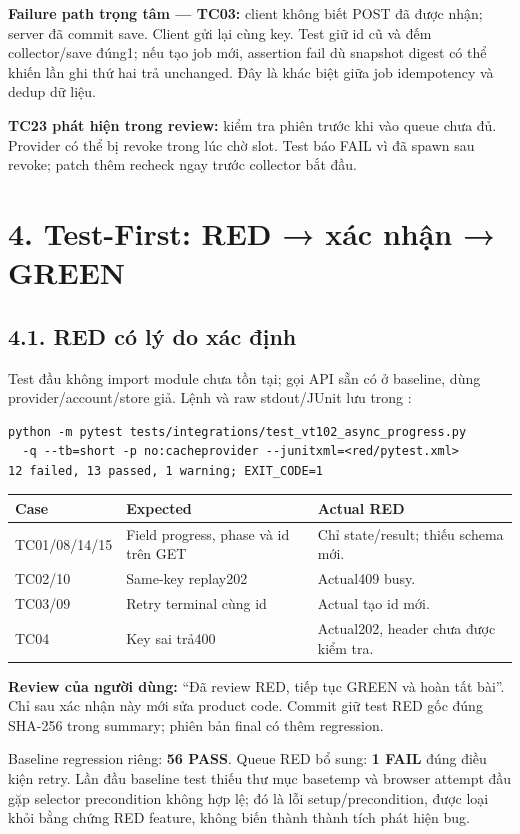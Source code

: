 \documentclass[10pt,a4paper]{article}
\newcommand{\code}[1]{{\small\expandafter\path\expandafter{#1}}}
\begin{document}
\textbf{Failure path trọng tâm — TC03:} client không biết POST đã được nhận; server đã commit save.
Client gửi lại cùng key. Test giữ id cũ và đếm collector/save đúng1; nếu tạo job mới, assertion fail dù
snapshot digest có thể khiến lần ghi thứ hai trả unchanged. Đây là khác biệt giữa job idempotency và dedup dữ liệu.

\textbf{TC23 phát hiện trong review:} kiểm tra phiên trước khi vào queue chưa đủ. Provider có thể bị revoke
trong lúc chờ slot. Test báo FAIL vì đã spawn sau revoke; patch thêm recheck ngay trước collector bắt đầu.
\clearpage

\section*{4. Test-First: RED → xác nhận → GREEN}
\subsection*{4.1. RED có lý do xác định}
Test đầu không import module chưa tồn tại; gọi API sẵn có ở baseline, dùng provider/account/store giả.
Lệnh và raw stdout/JUnit lưu trong \code{docs/vt102/evidence/red/}:
\begin{lstlisting}
python -m pytest tests/integrations/test_vt102_async_progress.py
  -q --tb=short -p no:cacheprovider --junitxml=<red/pytest.xml>
12 failed, 13 passed, 1 warning; EXIT_CODE=1
\end{lstlisting}
\par\begingroup\small
\begin{tabularx}{\linewidth}{@{}p{22mm}Y Y@{}}
\toprule{}\textbf{Case} & \textbf{Expected} & \textbf{Actual RED}\\\midrule
TC01/08/14/15 & Field progress, phase và id trên GET & Chỉ state/result; thiếu schema mới.\\
TC02/10 & Same-key replay202 & Actual409 busy.\\
TC03/09 & Retry terminal cùng id & Actual tạo id mới.\\
TC04 & Key sai trả400 & Actual202, header chưa được kiểm tra.\\
\bottomrule
\end{tabularx}\endgroup\par
\textbf{Review của người dùng:} “Đã review RED, tiếp tục GREEN và hoàn tất bài”. Chỉ sau xác nhận này mới sửa
product code. Commit \code{1fe363e} giữ test RED gốc đúng SHA-256 trong summary; phiên bản final có thêm regression.

Baseline regression riêng: \textbf{56 PASS}. Queue RED bổ sung: \textbf{1 FAIL} đúng điều kiện retry.
Lần đầu baseline test thiếu thư mục basetemp và browser attempt đầu gặp selector precondition không hợp lệ;
đó là lỗi setup/precondition, được loại khỏi bằng chứng RED feature, không biến thành thành tích phát hiện bug.
\end{document}
